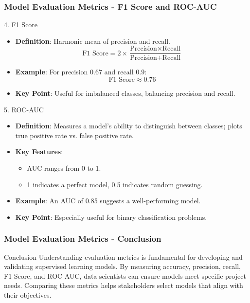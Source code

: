 \documentclass[aspectratio=169]{beamer}
\begin{document}
\begin{frame}[fragile]
    \frametitle{Model Evaluation Metrics - F1 Score and ROC-AUC}
    \begin{block}{4. F1 Score}
        \begin{itemize}
            \item \textbf{Definition}: Harmonic mean of precision and recall.
            \[
            \text{F1 Score} = 2 \times \frac{\text{Precision} \times \text{Recall}}{\text{Precision} + \text{Recall}}
            \]
            \item \textbf{Example}: For precision \(0.67\) and recall \(0.9\):
            \[
            \text{F1 Score} \approx 0.76
            \]
            \item \textbf{Key Point}: Useful for imbalanced classes, balancing precision and recall.
        \end{itemize}
    \end{block}
    
    \begin{block}{5. ROC-AUC}
        \begin{itemize}
            \item \textbf{Definition}: Measures a model's ability to distinguish between classes; plots true positive rate vs. false positive rate.
            \item \textbf{Key Features}:
            \begin{itemize}
                \item AUC ranges from 0 to 1.
                \item 1 indicates a perfect model, 0.5 indicates random guessing.
            \end{itemize}
            \item \textbf{Example}: An AUC of 0.85 suggests a well-performing model.
            \item \textbf{Key Point}: Especially useful for binary classification problems.
        \end{itemize}
    \end{block}
\end{frame}

\begin{frame}[fragile]
    \frametitle{Model Evaluation Metrics - Conclusion}
    \begin{block}{Conclusion}
        Understanding evaluation metrics is fundamental for developing and validating supervised learning models. 
        By measuring accuracy, precision, recall, F1 Score, and ROC-AUC, data scientists can ensure models meet specific project needs.
        Comparing these metrics helps stakeholders select models that align with their objectives.
    \end{block}
\end{frame}
\end{document}
